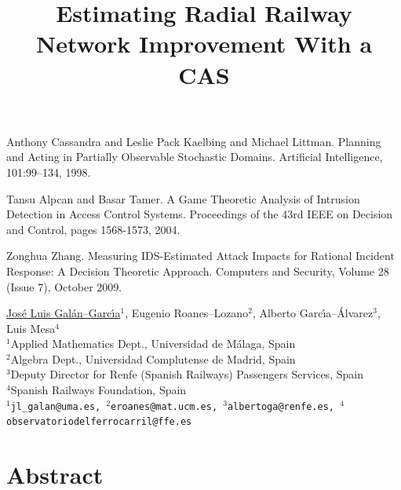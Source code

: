 \documentclass[article, A4, 11pt]{llncs}%
\begin{document}

\begin{thebibliography}{10}
{\sc Anthony Cassandra and Leslie Pack Kaelbing and Michael Littman}. {Planning and Acting in Partially Observable Stochastic Domains}. Artificial Intelligence, 101:99--134, 1998.

{\sc Tansu Alpcan and Basar Tamer}. {A Game Theoretic Analysis of Intrusion Detection in Access Control Systems}. Proceedings of the 43rd IEEE on Decision and Control, pages 1568-1573, 2004.

{\sc Zonghua Zhang}. {Measuring IDS-Estimated Attack Impacts for Rational Incident Response: A Decision Theoretic Approach}. Computers and Security, Volume 28 (Issue 7), October 2009.
\end{thebibliography} %

\title{Estimating Radial Railway Network Improvement With a CAS}
\author{} 
\institute{}
\maketitle
\begin{center}
{\large \underline{Jos\'e Luis Gal\'an--Garc\'{\i}a}$^1$, Eugenio Roanes--Lozano$^2$, Alberto Garc\'{\i}a--\'Alvarez$^3$,  Luis Mesa$^4$}\\
\vspace{4mm}
$^1$Applied Mathematics Dept., Universidad de M\'alaga, Spain\\
$^2$Algebra Dept., Universidad Complutense de Madrid, Spain\\
$^3$Deputy Director for Renfe (Spanish Railways) Passengers Services, Spain\\
$^4$Spanish Railways Foundation, Spain\\ 
\vspace{4mm}
{\tt$^1$jl\_galan@uma.es, $^2$eroanes@mat.ucm.es, $^3$albertoga@renfe.es,  $^4$observatoriodelferrocarril@ffe.es}
\end{center}

\section*{Abstract}
\end{document}

